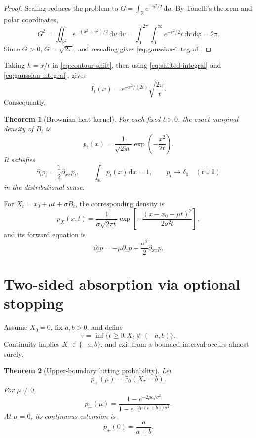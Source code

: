 \documentclass[10pt,a4paper]{article}
\numberwithin{equation}{section}
\theoremstyle{blueplain}
\newtheorem{theorem}{Theorem}[section]
\theoremstyle{definition}
\newcommand{\Pp}{\mathbb P}
\newcommand{\R}{\mathbb R}
\newcommand{\dd}{\,\mathrm d}
\begin{document}
\begin{proof}
Scaling reduces the problem to
\(G=\int_{\R}e^{-u^2/2}\dd u\).  By Tonelli's theorem and polar coordinates,
\[
  G^2=\iint_{\R^2}e^{-(u^2+v^2)/2}\dd u\dd v
  =\int_0^{2\pi}\int_0^\infty e^{-r^2/2}r\dd r\dd\varphi
  =2\pi.
\]
Since \(G>0\), \(G=\sqrt{2\pi}\), and rescaling gives
\eqref{eq:gaussian-integral}.
\end{proof}

Taking \(h=x/t\) in \eqref{eq:contour-shift}, then using
\eqref{eq:shifted-integral} and \eqref{eq:gaussian-integral}, gives
\[
  I_t(x)=e^{-x^2/(2t)}\sqrt{\frac{2\pi}{t}}.
\]
Consequently,
\begin{theorem}[Brownian heat kernel]
For each fixed \(t>0\), the exact marginal density of \(B_t\) is
\begin{equation}
  \boxed{
  p_t(x)=\frac1{\sqrt{2\pi t}}
  \exp\!\left(-\frac{x^2}{2t}\right)
  }.
  \label{eq:heat-kernel}
\end{equation}
It satisfies
\[
  \partial_t p_t=\frac12\partial_{xx}p_t,
  \qquad
  \int_{\R}p_t(x)\dd x=1,
  \qquad
  p_t\longrightarrow\delta_0\quad(t\downarrow0)
\]
in the distributional sense.
\end{theorem}

For \(X_t=x_0+\mu t+\sigma B_t\), the corresponding density is
\begin{equation}
  p_X(x,t)=\frac1{\sigma\sqrt{2\pi t}}
  \exp\!\left[-\frac{(x-x_0-\mu t)^2}{2\sigma^2t}\right],
  \label{eq:drifted-density}
\end{equation}
and its forward equation is
\[
  \partial_t p=-\mu\partial_xp+\frac{\sigma^2}{2}\partial_{xx}p.
\]

\section{Two-sided absorption via optional stopping}
\label{sec:brownian-exit}

Assume \(X_0=0\), fix \(a,b>0\), and define
\begin{equation}
  \tau=\inf\{t\ge0:X_t\notin(-a,b)\}.
  \label{eq:exit-time}
\end{equation}
Continuity implies \(X_\tau\in\{-a,b\}\), and exit from a bounded interval
occurs almost surely.

\begin{theorem}[Upper-boundary hitting probability]
Let
\[
  p_+(\mu)=\Pp_0(X_\tau=b).
\]
For \(\mu\ne0\),
\begin{equation}
  \boxed{
  p_+(\mu)
  =\frac{1-e^{-2\mu a/\sigma^2}}
         {1-e^{-2\mu(a+b)/\sigma^2}}
  }.
  \label{eq:hitting-probability}
\end{equation}
At \(\mu=0\), its continuous extension is
\begin{equation}
  p_+(0)=\frac{a}{a+b}.
  \label{eq:fair-hitting}
\end{equation}
\end{theorem}
\end{document}
